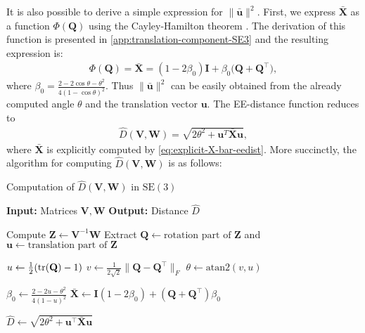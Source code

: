 It is also possible to derive a simple expression for $\|\bar{\mathbf{u}}\|^2$. First, we express $\bar{\mathbf{X}}$ as a function $\Phi(\mathbf{Q})$ using the Cayley-Hamilton theorem \citep[p. 63]{Chen2009}. The derivation of this function is presented in \cref{app:translation-component-SE3} and the resulting expression is:
\begin{align}
    \Phi(\mathbf{Q}) = \bar{\mathbf{X}} = (1-2\beta_0)\mathbf{I} + \beta_0\bigl(\mathbf{Q} + \mathbf{Q}^\top\bigr), \label{eq:explicit-X-bar-eedist}
\end{align}
where $\beta_0=\frac{2-2\cos\theta-\theta^2}{4(1 - \cos\theta)^2}$. Thus $\|\bar{\mathbf{u}}\|^2$ can be easily obtained from the already computed angle $\theta$ and the translation vector $\mathbf{u}$. The EE-distance function reduces to
\begin{align}
    \widehat{D}(\mathbf{V}, \mathbf{W}) = \sqrt{2\theta^2 + \mathbf{u}^T\bar{\mathbf{X}}\mathbf{u}}, \label{eq:explicit-EE-distance-SE3}
\end{align}
where $\bar{\mathbf{X}}$ is explicitly computed by \eqref{eq:explicit-X-bar-eedist}. More succinctly, the algorithm for computing $\widehat{D}(\mathbf{V}, \mathbf{W})$ is as follows:
\begin{algorithm}
    \caption{Computation of $\widehat{D}(\mathbf{V}, \mathbf{W})$ in $\text{SE}(3)$}
    \begin{algorithmic}[1]\label{alg:dhat-se3}
        \Statex \textbf{Input:} Matrices $\mathbf{V}, \mathbf{W}$
        \Statex \textbf{Output:} Distance $\widehat{D}$
        
        \State Compute $\mathbf{Z} \gets \mathbf{V}^{-1}\mathbf{W}$
        \State Extract $\mathbf{Q} \gets \text{rotation part of } \mathbf{Z}$ and $\mathbf{u} \gets \text{translation part of } \mathbf{Z}$

        \State $u \gets \frac{1}{2} (\operatorname{tr}(\mathbf{Q}) - 1)$
        \State $v \gets \frac{1}{2\sqrt{2}} \|\mathbf{Q} - \mathbf{Q}^\top\|_F$
        \State $\theta \gets \text{atan2}(v, u)$

        \State $\beta_0 \gets \frac{2 - 2u - \theta^2}{4(1 - u)^2}$
        \State $\bar{\mathbf{X}} \gets \mathbf{I}(1 - 2\beta_0) + (\mathbf{Q} + \mathbf{Q}^\top)\beta_0$

        \State $\widehat{D} \gets \sqrt{2\theta^2 + \mathbf{u}^\top \bar{\mathbf{X}} \mathbf{u}}$
    \end{algorithmic}
\end{algorithm}

